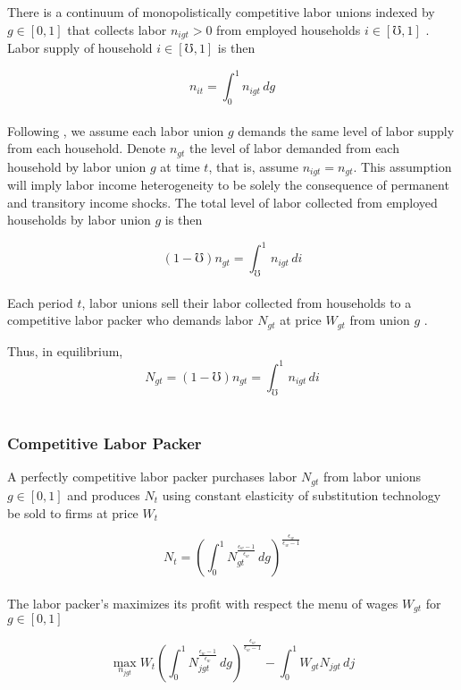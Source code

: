 \documentclass[titlepage]{\econtex}\providecommand{\texname}{FBS-NK}
\begin{document}
There is a continuum of monopolistically competitive labor unions indexed by $g \in [0,1]$ that collects labor $n_{igt} > 0$ from employed households $i \in [\mho,1]$ . Labor supply of household $i \in [\mho,1]$ is then

$$n_{it} = \int_{0}^{1} n_{igt}\,dg$$ \\

Following \cite{auclert2020micro}, we assume each labor union $g$ demands the same level  of labor supply from each household. Denote $n_{gt}$ the level of labor demanded from each household by labor union $g$ at time $t$, that is,  assume  $n_{igt} =\mathit{n}_{gt}$. This assumption will imply labor income heterogeneity to be solely the consequence of  permanent and transitory income shocks.
The total level of labor collected from employed households  by labor union $g$  is then 

$$  (1-\mho) \mathit{n}_{gt} = \int_{\mho}^{1} n_{igt}\,di $$ \\

Each period $t$, labor unions sell their labor collected from households to a competitive labor packer who demands labor $N_{gt}$ at price $W_{gt}$ from union $g$ . 

Thus, in equilibrium, $$  N_{gt} = (1-\mho) \mathit{n}_{gt} = \int_{\mho}^{1} n_{igt}\,di $$  \\


\hypertarget{Competitive Labor Packer}{}
\subsubsection{Competitive Labor Packer}



A perfectly competitive labor packer purchases labor $N_{gt}$ from labor unions $g \in [0,1]$ and produces $N_{t}$ using constant elasticity of substitution technology be sold to firms at price $W_{t}$

 
$$ N_{t} = \left(\int_{0}^{1} N_{gt}^{\frac{\epsilon_{w}-1}{\epsilon_{w}}}\,dg\right)^{\frac{\epsilon_{w}}{\epsilon_{w}-1}}$$ \\

The labor packer's maximizes its profit with respect the menu of wages $W_{gt}$ for $ g \in  [0,1]$

$$ \max_{n_{jgt}} W_{t} \left(\int_{0}^{1} N_{jgt}^{\frac{\epsilon_{w}-1}{\epsilon_{w}}} \, dg \right)^ {\frac{\epsilon_{w}}{\epsilon_{w}-1}} - \int_{0}^{1} W_{gt}N_{jgt}\, dj $$ \\
\end{document}
